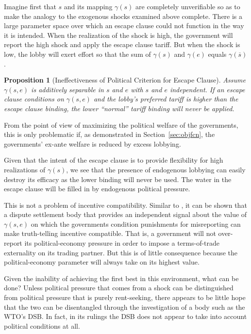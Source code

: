 \documentclass[12pt]{article}
\newtheorem{proposition}{Proposition}
\newcommand{\ov}{\overline}
\newcommand{\ga}{\gamma}
\begin{document}
Imagine first that $s$ and its mapping $\ga(s)$ are completely unverifiable so as to make the analogy to the exogenous shocks examined above complete. There is a large parameter space over which an escape clause could not function in the way it is intended. When the realization of the shock is high, the government will report the high shock and apply the escape clause tariff. But when the shock is low, the lobby will exert effort so that the sum of $\ga(s)$ and $\ga(e)$ equals $\ga(\ov{s})$.

\begin{proposition}[Ineffectiveness of Political Criterion for Escape Clause]
    Assume $\ga(s,e)$ is additively separable in $s$ and $e$ with $s$ and $e$ independent. If an escape clause conditions on $\ga(s,e)$ and the lobby's preferred tariff is higher than the escape clause binding, the lower ``normal'' tariff binding will never be applied.
\end{proposition}

From the point of view of maximizing the political welfare of the governments, this is only problematic if, as demonstrated in Section~\ref{sec:objfcn}, the governments' ex-ante welfare is reduced by excess lobbying.

Given that the intent of the escape clause is to provide flexibility for high realizations of $\ga(s)$, we see that the presence of endogenous lobbying can easily destroy its efficacy as the lower binding will never be used. The water in the escape clause will be filled in by endogenous political pressure.

This is not a problem of incentive compatibility. Similar to \Textcite{beshkar2010b}, it can be shown that a dispute settlement body that provides an independent signal about the value of $\ga(s,e)$ on which the governments condition punishments for misreporting can make truth-telling incentive compatible. That is, a government will not over-report its political-economy pressure in order to impose a terms-of-trade externality on its trading partner. But this is of little consequence because the political-economy parameter will always take on its highest value.

Given the inability of achieving the first best in this environment, what can be done? Unless political pressure that comes from a shock can be distinguished from political pressure that is purely rent-seeking, there appears to be little hope that the two can be disentangled through the investigation of a body such as the WTO's DSB. In fact, in its rulings the DSB does not appear to take into account political conditions at all.
\end{document}
